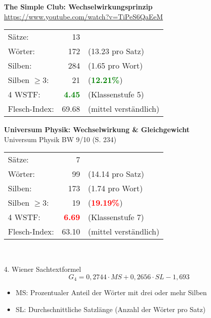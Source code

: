\documentclass[
	aspectratio=169, %
	8pt, %
]{beamer}
\begin{document}
\begin{frame}
	\begin{mycolumns}
\textbf{The Simple Club: Wechselwirkungsprinzip} \\ {\tiny \href{https://www.youtube.com/watch?v=TiPeS6QaEeM}{https://www.youtube.com/watch?v=TiPeS6QaEeM}} \\[1em]
		\begin{tabular}{lrl}
			Sätze:  & 13  & \\
			Wörter: & 172 & (13.23 pro Satz) \\
			Silben: & 284 & (1.65 pro Wort) \\
			Silben $\geq 3$:& 21 & (\textcolor{green}{\textbf{12.21\%}}) \\
			4 WSTF: & \textcolor{green}{\textbf{4.45}}  & (Klassenstufe 5)\\
			Flesch-Index: & 69.68 & (mittel verständlich)\\  
		\end{tabular}

		\mynextcolumn
\textbf{Universum Physik: Wechselwirkung \& Gleichgewicht} \\
{\tiny Universum Physik BW 9/10 (S. 234)}\\[1em]
\begin{tabular}{lrl}
	Sätze: & 7    & \\
	Wörter: & 99  & (14.14 pro Satz) \\
	Silben: & 173 & (1.74 pro Wort) \\
	Silben $\geq 3$: & 19 & (\textcolor{red}{\textbf{19.19\%}}) \\
	4 WSTF: & \textcolor{red}{\textbf{6.69}} & (Klassenstufe 7)\\
	Flesch-Index: & 63.10 & (mittel verständlich)\\  
\end{tabular}
	\end{mycolumns}
	\ \\[2em]
	\begin{definition}{4. Wiener Sachtextformel}
$$G_4 = 0{,}2744 \cdot MS + 0{,}2656 \cdot SL - 1{,}693 $$
	\begin{itemize}
		\item MS: Prozentualer Anteil der Wörter mit drei oder mehr Silben
		\item SL: Durchschnittliche Satzlänge (Anzahl der Wörter pro Satz)
	\end{itemize}
				
\end{definition}
\end{frame}
\end{document}
